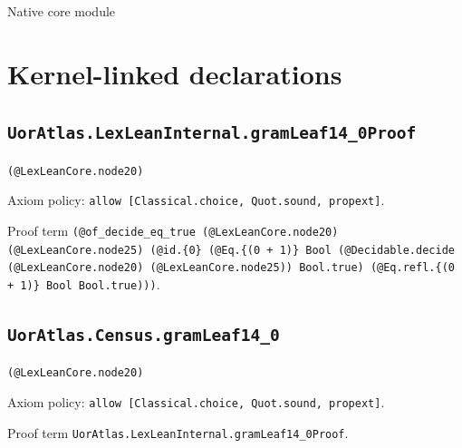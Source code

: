 \documentclass[11pt]{article}
\begin{document}
\begin{center}{\LARGE Native core module}\end{center}
\section*{Kernel-linked declarations}
\subsection*{\texttt{UorAtlas.LexLeanInternal.gramLeaf14\_0Proof}}
\noindent\texttt{(@LexLeanCore.node20)}\par
\noindent Axiom policy: \texttt{allow [Classical.choice, Quot.sound, propext]}.\par
\noindent Proof term \texttt{(@of\_decide\_eq\_true (@LexLeanCore.node20) (@LexLeanCore.node25) (@id.\{0\} (@Eq.\{(0 + 1)\} Bool (@Decidable.decide (@LexLeanCore.node20) (@LexLeanCore.node25)) Bool.true) (@Eq.refl.\{(0 + 1)\} Bool Bool.true)))}.\par
\subsection*{\texttt{UorAtlas.Census.gramLeaf14\_0}}
\noindent\texttt{(@LexLeanCore.node20)}\par
\noindent Axiom policy: \texttt{allow [Classical.choice, Quot.sound, propext]}.\par
\noindent Proof term \texttt{UorAtlas.LexLeanInternal.gramLeaf14\_0Proof}.\par
\end{document}
